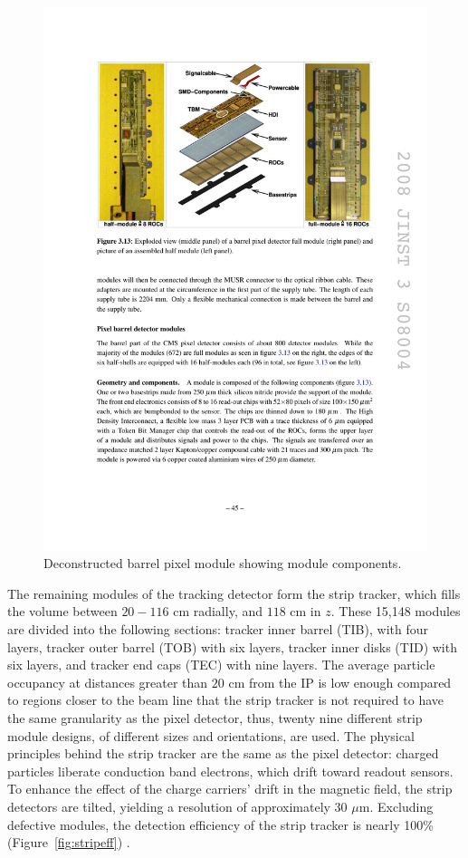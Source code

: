 \begin{figure}[tbh]
\centering
\includegraphics[width=5.5in]{figures/pixelmodule.pdf}
\caption{Deconstructed barrel pixel module showing module components.}
\label{fig:pixmodule}
\end{figure}

\indent The remaining modules of the tracking detector form the strip tracker, which fills the volume between $20-116$ cm radially, and $118$ cm in $z$. These 15,148 modules are divided into the following sections: tracker inner barrel (TIB), with four layers, tracker outer barrel (TOB) with six layers, tracker inner disks (TID) with six layers, and tracker end caps (TEC) with nine layers. The average particle occupancy at distances greater than $20$ cm from the IP is low enough compared to regions closer to the beam line that the strip tracker is not required to have the same granularity as the pixel detector, thus, twenty nine different strip module designs, of different sizes and orientations, are used. The physical principles behind the strip tracker are the same as the pixel detector: charged particles liberate conduction band electrons, which drift toward readout sensors. To enhance the effect of the charge carriers' drift in the magnetic field, the strip detectors are tilted, yielding a resolution of approximately 30 $\mu$m. Excluding defective modules, the detection efficiency of the strip tracker is nearly 100\% (Figure~\ref{fig:stripeff}) \cite{Chatrchyan:2014fea}.

